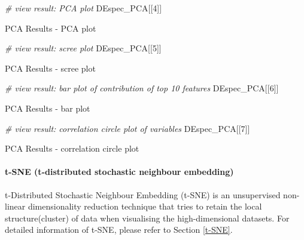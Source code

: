 \documentclass[]{article}
\newcommand{\hlnum}[1]{\textcolor[rgb]{0.816,0.125,0.439}{#1}}%
\newcommand{\hlcom}[1]{\textcolor[rgb]{0.502,0.502,0.502}{\textit{#1}}}%
\newcommand{\hlstd}[1]{\textcolor[rgb]{0.251,0.251,0.251}{#1}}%
\newenvironment{Shaded}{\begin{myshaded}}{\end{myshaded}}
\newcommand{\DecValTok}[1]{\hlnum{#1}}
\newcommand{\CommentTok}[1]{\hlcom{#1}}
\newcommand{\NormalTok}[1]{\hlstd{#1}}
\begin{document}
\begin{Shaded}
\begin{Highlighting}[]
\CommentTok{# view result: PCA plot}
\NormalTok{DEspec_PCA[[}\DecValTok{4}\NormalTok{]]  }
\end{Highlighting}
\end{Shaded}

\label{fig:unnamed-chunk-20}PCA Results - PCA plot

\begin{Shaded}
\begin{Highlighting}[]
\CommentTok{# view result: scree plot}
\NormalTok{DEspec_PCA[[}\DecValTok{5}\NormalTok{]] }
\end{Highlighting}
\end{Shaded}

\label{fig:unnamed-chunk-21}PCA Results - scree plot

\begin{Shaded}
\begin{Highlighting}[]
\CommentTok{# view result: bar plot of contribution of top 10 features}
\NormalTok{DEspec_PCA[[}\DecValTok{6}\NormalTok{]]  }
\end{Highlighting}
\end{Shaded}

\label{fig:unnamed-chunk-22}PCA Results - bar plot

\begin{Shaded}
\begin{Highlighting}[]
\CommentTok{# view result: correlation circle plot of variables}
\NormalTok{DEspec_PCA[[}\DecValTok{7}\NormalTok{]]}
\end{Highlighting}
\end{Shaded}

\label{fig:unnamed-chunk-23}PCA Results - correlation circle plot

\hypertarget{t-sne-t-distributed-stochastic-neighbour-embedding}{%
\paragraph{t-SNE (t-distributed stochastic neighbour embedding)}\label{t-sne-t-distributed-stochastic-neighbour-embedding}}

t-Distributed Stochastic Neighbour Embedding (t-SNE) is an unsupervised non-linear dimensionality reduction technique that tries to retain the local structure(cluster) of data when visualising the high-dimensional datasets. For detailed information of t-SNE, please refer to Section \ref{t-SNE}.
\end{document}
